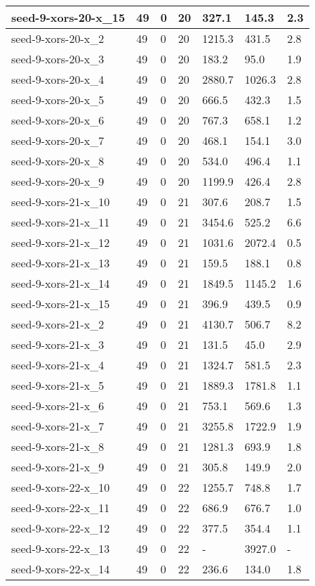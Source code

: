 \begin{scriptsize}
\begin{longtable}{|p{5cm}|l|l|l|l|l|l|}
seed-9-xors-20-x\_15&49&0&20&327.1&145.3&2.3 \\ \hline 
seed-9-xors-20-x\_2&49&0&20&1215.3&431.5&2.8 \\ \hline 
seed-9-xors-20-x\_3&49&0&20&183.2&95.0&1.9 \\ \hline 
seed-9-xors-20-x\_4&49&0&20&2880.7&1026.3&2.8 \\ \hline 
seed-9-xors-20-x\_5&49&0&20&666.5&432.3&1.5 \\ \hline 
seed-9-xors-20-x\_6&49&0&20&767.3&658.1&1.2 \\ \hline 
seed-9-xors-20-x\_7&49&0&20&468.1&154.1&3.0 \\ \hline 
seed-9-xors-20-x\_8&49&0&20&534.0&496.4&1.1 \\ \hline 
seed-9-xors-20-x\_9&49&0&20&1199.9&426.4&2.8 \\ \hline 
seed-9-xors-21-x\_10&49&0&21&307.6&208.7&1.5 \\ \hline 
seed-9-xors-21-x\_11&49&0&21&3454.6&525.2&6.6 \\ \hline 
seed-9-xors-21-x\_12&49&0&21&1031.6&2072.4&0.5 \\ \hline 
seed-9-xors-21-x\_13&49&0&21&159.5&188.1&0.8 \\ \hline 
seed-9-xors-21-x\_14&49&0&21&1849.5&1145.2&1.6 \\ \hline 
seed-9-xors-21-x\_15&49&0&21&396.9&439.5&0.9 \\ \hline 
seed-9-xors-21-x\_2&49&0&21&4130.7&506.7&8.2 \\ \hline 
seed-9-xors-21-x\_3&49&0&21&131.5&45.0&2.9 \\ \hline 
seed-9-xors-21-x\_4&49&0&21&1324.7&581.5&2.3 \\ \hline 
seed-9-xors-21-x\_5&49&0&21&1889.3&1781.8&1.1 \\ \hline 
seed-9-xors-21-x\_6&49&0&21&753.1&569.6&1.3 \\ \hline 
seed-9-xors-21-x\_7&49&0&21&3255.8&1722.9&1.9 \\ \hline 
seed-9-xors-21-x\_8&49&0&21&1281.3&693.9&1.8 \\ \hline 
seed-9-xors-21-x\_9&49&0&21&305.8&149.9&2.0 \\ \hline 
seed-9-xors-22-x\_10&49&0&22&1255.7&748.8&1.7 \\ \hline 
seed-9-xors-22-x\_11&49&0&22&686.9&676.7&1.0 \\ \hline 
seed-9-xors-22-x\_12&49&0&22&377.5&354.4&1.1 \\ \hline 
seed-9-xors-22-x\_13&49&0&22&-&3927.0&- \\ \hline 
seed-9-xors-22-x\_14&49&0&22&236.6&134.0&1.8 \\ \hline 

\end{longtable}
\end{scriptsize}
